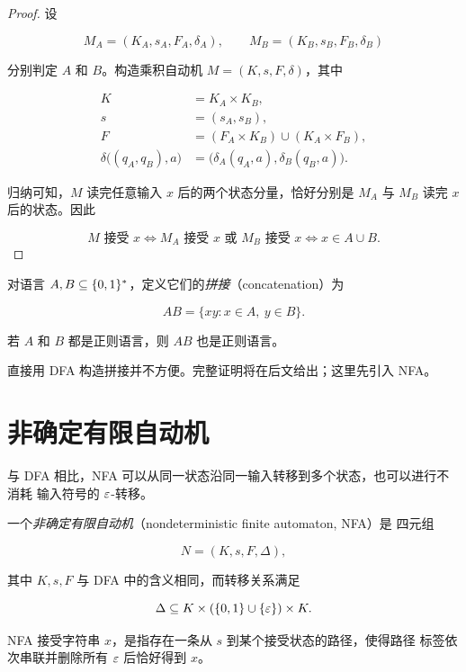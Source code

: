 \begin{proof}
  设

  \[
    M_A=(K_A,s_A,F_A,\delta_A),
    \qquad
    M_B=(K_B,s_B,F_B,\delta_B)
  \]

  分别判定 $A$ 和 $B$。构造乘积自动机 $M=(K,s,F,\delta)$，其中

  \begin{align*}
    K&=K_A\times K_B,\\
    s&=(s_A,s_B),\\
    F&=(F_A\times K_B)\cup(K_A\times F_B),\\
    \delta\bigl((q_A,q_B),a\bigr)
      &=\bigl(\delta_A(q_A,a),\delta_B(q_B,a)\bigr).
  \end{align*}

  归纳可知，$M$ 读完任意输入 $x$ 后的两个状态分量，恰好分别是
  $M_A$ 与 $M_B$ 读完 $x$ 后的状态。因此

  \[
    M\text{ 接受 }x
    \iff M_A\text{ 接受 }x\text{ 或 }M_B\text{ 接受 }x
    \iff x\in A\cup B.
  \]
\end{proof}

对语言 $A,B\subseteq\{0,1\}^{*}$，定义它们的\emph{拼接}（concatenation）为

\[
  AB=\{xy:x\in A,\ y\in B\}.
\]

\begin{theorem}[对拼接封闭]
  \label{thm:regular-closed-under-concatenation}
  若 $A$ 和 $B$ 都是正则语言，则 $AB$ 也是正则语言。
\end{theorem}

直接用 DFA 构造拼接并不方便。完整证明将在后文给出；这里先引入 NFA。

\section{非确定有限自动机}

与 DFA 相比，NFA 可以从同一状态沿同一输入转移到多个状态，也可以进行不消耗
输入符号的 $\varepsilon$-转移。

\begin{definition}[非确定有限自动机]
  \label{def:nfa}
  一个\emph{非确定有限自动机}（nondeterministic finite automaton, NFA）是
  四元组

  \[
    N=(K,s,F,\Delta),
  \]

  其中 $K,s,F$ 与 DFA 中的含义相同，而转移关系满足

  \[
    \Delta\subseteq K\times(\{0,1\}\cup\{\varepsilon\})\times K.
  \]

  NFA 接受字符串 $x$，是指存在一条从 $s$ 到某个接受状态的路径，使得路径
  标签依次串联并删除所有 $\varepsilon$ 后恰好得到 $x$。
\end{definition}

